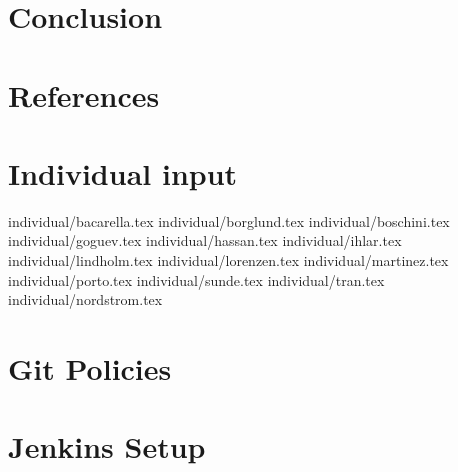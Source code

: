 \documentclass[11pt]{report}
\begin{document}
\chapter{Conclusion}


\chapter{References}

\appendix
\chapter{Individual input}

 {individual/bacarella.tex}
 {individual/borglund.tex}
 {individual/boschini.tex}
 {individual/goguev.tex}
 {individual/hassan.tex}
 {individual/ihlar.tex}
 {individual/lindholm.tex}
 {individual/lorenzen.tex}
 {individual/martinez.tex}
 {individual/porto.tex}
 {individual/sunde.tex}
 {individual/tran.tex}
 {individual/nordstrom.tex}

\chapter{Git Policies}

\chapter{Jenkins Setup}
\end{document}
